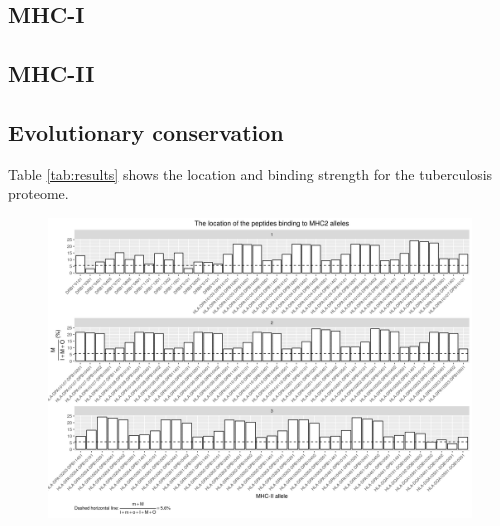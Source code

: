 \documentclass{article}
\begin{document}
\subsection{MHC-I}



\subsection{MHC-II}

\subsection{Evolutionary conservation}

Table \ref{tab:results} shows the location and binding strength for the
tuberculosis proteome.

\begin{figure}[ht]
  \includegraphics[width=\textwidth]{figure_1.png}
  \label{fig:1}
\end{figure}
\end{document}
